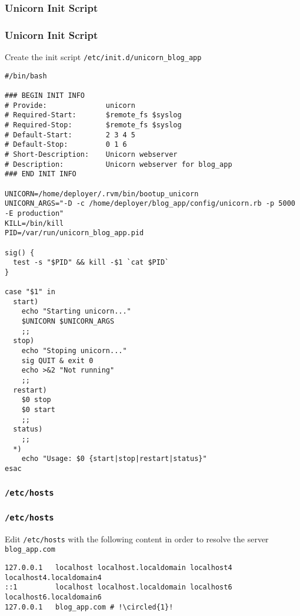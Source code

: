 \subsubsection{Unicorn Init Script}
\begin{frame}
\frametitle{Unicorn Init Script}

Create the init script \texttt{/etc/init.d/unicorn\_blog\_app}
\lstset{language=shell, escapechar=!}
\begin{lstlisting}[escapechar=!]
#/bin/bash

### BEGIN INIT INFO
# Provide:              unicorn
# Required-Start:       $remote_fs $syslog
# Required-Stop:        $remote_fs $syslog
# Default-Start:        2 3 4 5
# Default-Stop:         0 1 6
# Short-Description:    Unicorn webserver
# Description:          Unicorn webserver for blog_app
### END INIT INFO

UNICORN=/home/deployer/.rvm/bin/bootup_unicorn
UNICORN_ARGS="-D -c /home/deployer/blog_app/config/unicorn.rb -p 5000 -E production"
KILL=/bin/kill
PID=/var/run/unicorn_blog_app.pid

sig() {
  test -s "$PID" && kill -$1 `cat $PID`
}

case "$1" in
  start)
    echo "Starting unicorn..."
    $UNICORN $UNICORN_ARGS
    ;;
  stop)
    echo "Stoping unicorn..."
    sig QUIT & exit 0
    echo >&2 "Not running"
    ;;
  restart)
    $0 stop
    $0 start
    ;;
  status)
    ;;
  *)
    echo "Usage: $0 {start|stop|restart|status}"
esac             
\end{lstlisting}
\end{frame}


\subsubsection{\texttt{/etc/hosts}}
\begin{frame}[fragile]
\frametitle{\texttt{/etc/hosts}}
Edit \texttt{/etc/hosts} with the following content in order to resolve the server \texttt{blog\_app.com}
\lstset{language=shell, escapechar=!}
\begin{lstlisting}[escapechar=!]
127.0.0.1   localhost localhost.localdomain localhost4 localhost4.localdomain4
::1         localhost localhost.localdomain localhost6 localhost6.localdomain6
127.0.0.1   blog_app.com # !\circled{1}!
\end{lstlisting}
\end{frame}



